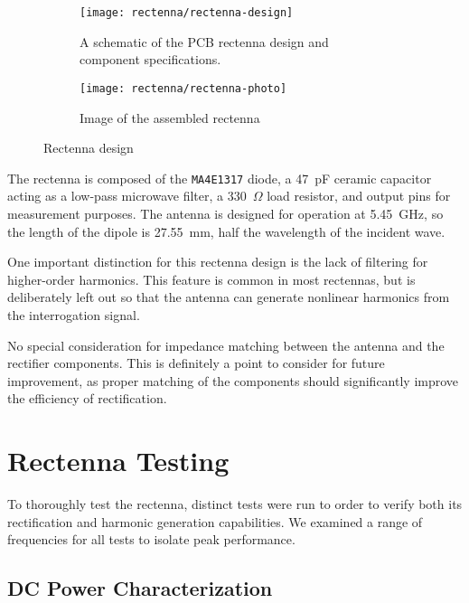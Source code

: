 \begin{figure}[h!]
    \centering
    \begin{subfigure}{.85\textwidth}
        \centering
        \texttt{[image: rectenna/rectenna-design]}
        \caption[Rectenna schematica]{A schematic of the PCB rectenna design and component specifications.}
    \end{subfigure}
    \begin{subfigure}{.85\textwidth}
        \centering
        \texttt{[image: rectenna/rectenna-photo]}
        \caption[Assembled rectenna photo]{Image of the assembled rectenna}
    \end{subfigure}
    \caption[Rectenna design]{Rectenna design}
    \label{fig:rectenna-design}
\end{figure}

The rectenna is composed of the \texttt{MA4E1317} diode, a 47~pF ceramic capacitor acting as a low-pass microwave filter, a 330~$\Omega$ load resistor, and output pins for measurement purposes. The antenna is designed for operation at 5.45~GHz, so the length of the dipole is 27.55~mm, half the wavelength of the incident wave.

One important distinction for this rectenna design is the lack of filtering for higher-order harmonics. This feature is common in most rectennas, but is deliberately left out so that the antenna can generate nonlinear harmonics from the interrogation signal.

No special consideration for impedance matching between the antenna and the rectifier components. This is definitely a point to consider for future improvement, as proper matching of the components should significantly improve the efficiency of rectification.

\section{Rectenna Testing}
\label{sec:rectenna-testing}

To thoroughly test the rectenna, distinct tests were run to order to verify both its rectification and harmonic generation capabilities. We examined a range of frequencies for all tests to isolate peak performance.

\subsection{DC Power Characterization}

